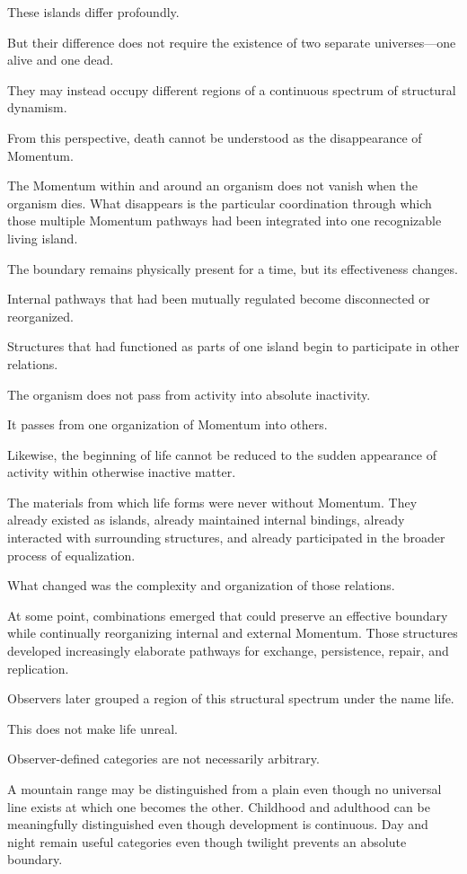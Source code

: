 These islands differ profoundly.

But their difference does not require the existence of two separate universes—one alive and one dead.

They may instead occupy different regions of a continuous spectrum of structural dynamism.

From this perspective, death cannot be understood as the disappearance of Momentum.

The Momentum within and around an organism does not vanish when the organism dies. What disappears is the particular coordination through which those multiple Momentum pathways had been integrated into one recognizable living island.

The boundary remains physically present for a time, but its effectiveness changes.

Internal pathways that had been mutually regulated become disconnected or reorganized.

Structures that had functioned as parts of one island begin to participate in other relations.

The organism does not pass from activity into absolute inactivity.

It passes from one organization of Momentum into others.

Likewise, the beginning of life cannot be reduced to the sudden appearance of activity within otherwise inactive matter.

The materials from which life forms were never without Momentum. They already existed as islands, already maintained internal bindings, already interacted with surrounding structures, and already participated in the broader process of equalization.

What changed was the complexity and organization of those relations.

At some point, combinations emerged that could preserve an effective boundary while continually reorganizing internal and external Momentum. Those structures developed increasingly elaborate pathways for exchange, persistence, repair, and replication.

Observers later grouped a region of this structural spectrum under the name life.

This does not make life unreal.

Observer-defined categories are not necessarily arbitrary.

A mountain range may be distinguished from a plain even though no universal line exists at which one becomes the other. Childhood and adulthood can be meaningfully distinguished even though development is continuous. Day and night remain useful categories even though twilight prevents an absolute boundary.

